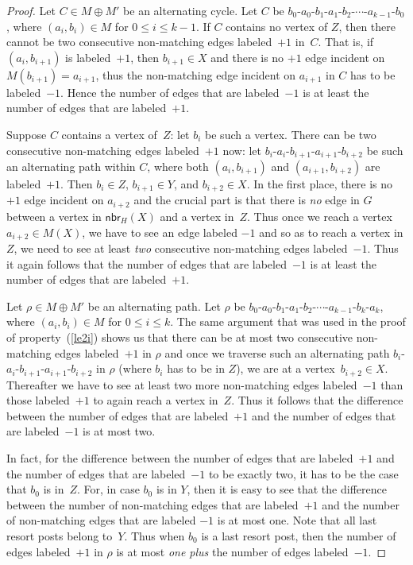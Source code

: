 \documentclass[11pt]{llncs}
\newcommand{\Nbr}{\mathsf{nbr}}
\begin{document}
\begin{proof}
 Let $C \in M \oplus M'$ be an alternating cycle. Let $C$ be 
$b_0$-$a_0$-$b_1$-$a_1$-$b_2$-$\cdots$-$a_{k-1}$-$b_0$, 
where $(a_i,b_i) \in M$ for $0 \le i \le k-1$. If $C$ contains no vertex of $Z$, then there cannot
be two consecutive non-matching edges labeled~$+1$ in~$C$. That is, if $(a_i,b_{i+1})$ is 
labeled~$+1$, then $b_{i+1} \in X$ and there is no $+1$ edge incident on $M(b_{i+1}) = a_{i+1}$, thus the non-matching edge incident on $a_{i+1}$ 
in $C$ has to be labeled~$-1$. Hence the number of edges that are labeled~$-1$ is at least the number of edges 
that are labeled~$+1$.

Suppose $C$ contains a vertex of~$Z$: let $b_i$ be such a vertex. There can be two consecutive non-matching edges labeled~$+1$ now: let $b_i$-$a_i$-$b_{i+1}$-$a_{i+1}$-$b_{i+2}$ be such an alternating path within $C$, where both $(a_i,b_{i+1})$ and $(a_{i+1},b_{i+2})$ are labeled~$+1$. Then $b_i \in Z$, $b_{i+1} \in Y$, and $b_{i+2} \in X$. In the first place, there is no $+1$ edge incident on $a_{i+2}$ and the crucial part is that there is {\em no} edge in $G$ between a vertex in $\Nbr_H(X)$ and a vertex in~$Z$. Thus once we reach a vertex $a_{i+2} \in M(X)$, we have to see an edge labeled  $-1$ and so as to reach a vertex in $Z$, we need to see at least {\em two} consecutive non-matching edges labeled~$-1$. Thus it again follows that the number of edges that are labeled~$-1$ is at least the number of edges that are labeled~$+1$.

\medskip

 Let $\rho \in M \oplus M'$ be an alternating path. Let $\rho$ be
$b_0$-$a_0$-$b_1$-$a_1$-$b_2$-$\cdots$-$a_{k-1}$-$b_k$-$a_k$, where $(a_i,b_i) \in M$ for 
$0 \le i \le k$. The same argument that was used in the proof of property~(\ref{le2i}) shows us that 
there can be at most two consecutive non-matching edges labeled~$+1$ in $\rho$ and once we 
traverse such an alternating path $b_i$-$a_i$-$b_{i+1}$-$a_{i+1}$-$b_{i+2}$ in $\rho$ (where $b_i$ 
has to be in $Z$), we are at a vertex~$b_{i+2} \in X$. Thereafter we have to see at least two more 
non-matching edges 
labeled~$-1$ than those labeled~$+1$ to again reach a vertex in~$Z$. Thus it follows that the 
difference between the number of edges that are labeled~$+1$ and the number of edges that are 
labeled~$-1$ is at most two.
 
In fact, for the difference between the number of edges that are labeled~$+1$ and the number of 
edges that are labeled~$-1$ to be exactly two, it has to be the case that $b_0$ is in~$Z$. For, in 
case $b_0$ is in $Y$, then it is easy to see that the difference between the number of 
non-matching edges that are labeled~$+1$ and the number of non-matching edges that are labeled 
$-1$ is at most one. Note that all last resort posts belong to~$Y$. Thus when $b_0$ is a last 
resort post, then the number of edges labeled~$+1$ in $\rho$ is at most {\em one plus} the 
number of edges labeled~$-1$.


\end{proof}
\end{document}
